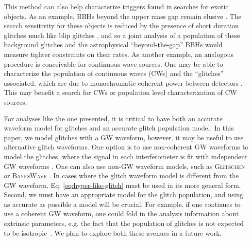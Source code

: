 \begin{refsection}
This method can also help characterize triggers found in searches for exotic objects. As an example, BBHs beyond the upper mass gap remain elusive \citep{2021ApJ...909L..23E}. The search sensitivity for these objects is reduced by the presence of short duration glitches much like blip glitches \citep{2019CQGra..36o5010C}, and so a joint analysis of a population of these background glitches and the astrophysical ``beyond-the-gap'' BBHs would measure tighter constraints on their rates. As another example, an analogous procedure is conceivable for continuous wave sources. One may be able to characterize the population of continuous waves (CWs) and the ``glitches'' associated, which are due to monochromatic coherent power between detectors \citep{2021A&A...649A..92C, 2020ApJ...902L..21A,2022PhRvD.106j2008A,2022ApJ...935....1A}. This may benefit a search for CWs or population level characterization of CW sources.


For analyses like the one presented, it is critical to have both an accurate waveform model for glitches and an accurate glitch population model. In this paper, we model glitches with a GW waveform, however, it may be useful to use alternative glitch waveforms. One option is to use non-coherent GW waveforms to model the glitches, where the signal in each interferometer is fit with independent GW waveforms \citep{2010PhRvD..81f2003V}. One can also use non-GW waveform models, such as \textsc{Glitschen} \citep{2021PhRvD.104j2004M} or \textsc{BayesWave} \citep{2015CQGra..32m5012C}. In cases where the glitch waveform model is different from the GW waveform, Eq. \ref{eq:hyper-like-glitch} must be used in its more general form. 
Second, we must have an appropriate model for the glitch population, and using as accurate as possible a model will be crucial. For example, if one continues to use a coherent GW waveform, one could fold in the analysis information about extrinsic parameters, e.g. the fact that the population of glitches is not expected to be isotropic~\citep{2020PhRvD.102j2004P,2022arXiv220400968V,2023PhRvD.107d3016E}. We plan to explore both these avenues in a future work.


\end{refsection}
